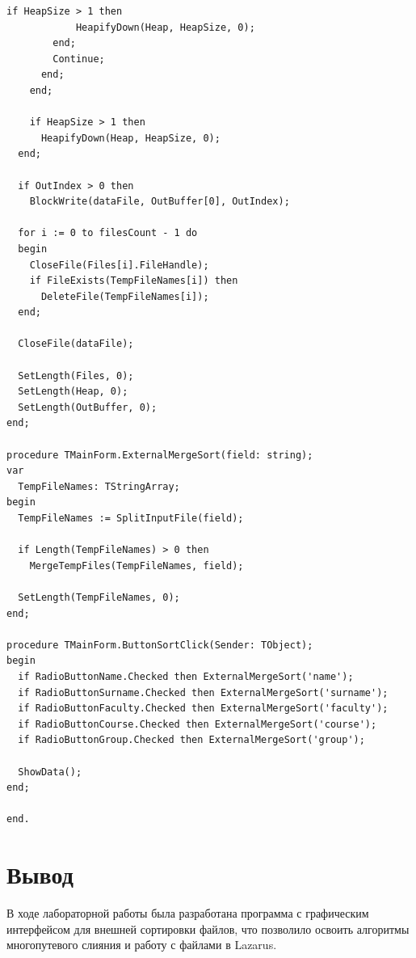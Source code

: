 \documentclass[a4paper,14pt]{extarticle}
\begin{document}
\begin{Verbatim}[tabsize=4,fontsize=\small]
          if HeapSize > 1 then
            HeapifyDown(Heap, HeapSize, 0);
        end;
        Continue;
      end;
    end;

    if HeapSize > 1 then
      HeapifyDown(Heap, HeapSize, 0);
  end;

  if OutIndex > 0 then
    BlockWrite(dataFile, OutBuffer[0], OutIndex);

  for i := 0 to filesCount - 1 do
  begin
    CloseFile(Files[i].FileHandle);
    if FileExists(TempFileNames[i]) then
      DeleteFile(TempFileNames[i]);
  end;

  CloseFile(dataFile);

  SetLength(Files, 0);
  SetLength(Heap, 0);
  SetLength(OutBuffer, 0);
end;

procedure TMainForm.ExternalMergeSort(field: string);
var
  TempFileNames: TStringArray;
begin
  TempFileNames := SplitInputFile(field);

  if Length(TempFileNames) > 0 then
    MergeTempFiles(TempFileNames, field);

  SetLength(TempFileNames, 0);
end;

procedure TMainForm.ButtonSortClick(Sender: TObject);
begin
  if RadioButtonName.Checked then ExternalMergeSort('name');
  if RadioButtonSurname.Checked then ExternalMergeSort('surname');
  if RadioButtonFaculty.Checked then ExternalMergeSort('faculty');
  if RadioButtonCourse.Checked then ExternalMergeSort('course');
  if RadioButtonGroup.Checked then ExternalMergeSort('group');

  ShowData();
end;

end.
  \end{Verbatim}

  \section*{Вывод}
  В ходе лабораторной работы была разработана программа с графическим интерфейсом для внешней сортировки файлов, что позволило освоить алгоритмы многопутевого слияния и работу с файлами в Lazarus.
\end{document}
